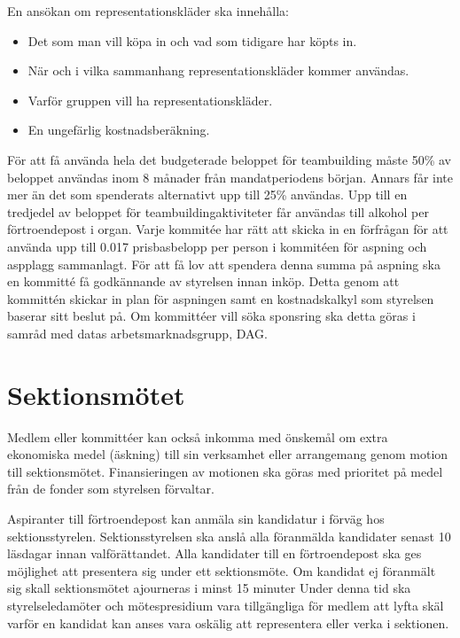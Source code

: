 \documentclass[a4paper]{dteklag}
\begin{document}
\para
En ansökan om representationskläder ska innehålla:
\begin{itemize}
  \item Det som man vill köpa in och vad som tidigare har köpts in.
  \item När och i vilka sammanhang representationskläder kommer användas.
  \item Varför gruppen vill ha representationskläder.
  \item En ungefärlig kostnadsberäkning.
\end{itemize}
\para[Teambuilding] För att få använda hela det budgeterade beloppet för teambuilding måste 50\% av beloppet användas inom 8 månader från mandatperiodens början. Annars får inte mer än det som spenderats alternativt upp till 25\% användas.
\para Upp till en tredjedel av beloppet för teambuildingaktiviteter får användas till alkohol per förtroendepost i organ.
\para [Aspning] Varje kommitée har rätt att skicka in en förfrågan för att använda upp till
0.017 prisbasbelopp per person i kommitéen för aspning och aspplagg sammanlagt. För att
få lov att spendera denna summa på aspning ska en kommitté få godkännande av
styrelsen innan inköp. Detta genom att kommittén skickar in plan för aspningen samt
en kostnadskalkyl som styrelsen baserar sitt beslut på.
\para[Sponsring] Om kommittéer vill söka sponsring ska detta göras i samråd med datas arbetsmarknadsgrupp, DAG.
\section{Sektionsmötet}
 Medlem eller kommittéer kan också inkomma med önskemål om extra ekonomiska medel (äskning) till sin verksamhet eller arrangemang genom motion till sektionsmötet. Finansieringen av motionen ska göras med prioritet på medel från de fonder som styrelsen förvaltar. 

\para[Föranmälan] Aspiranter till förtroendepost kan anmäla sin kandidatur i förväg hos sektionsstyrelen.
\para 
\para Sektionsstyrelsen ska anslå alla föranmälda kandidater senast 10 läsdagar innan valförättandet.
\para[Inval] Alla kandidater till en förtroendepost ska ges möjlighet att presentera sig under ett sektionsmöte.
\para Om kandidat ej föranmält sig skall sektionsmötet ajourneras i minst 15 minuter
\stycke Under denna tid ska styrelseledamöter och mötespresidium vara tillgängliga för medlem att lyfta skäl varför en kandidat kan anses vara oskälig att representera eller verka i sektionen.
\end{document}
